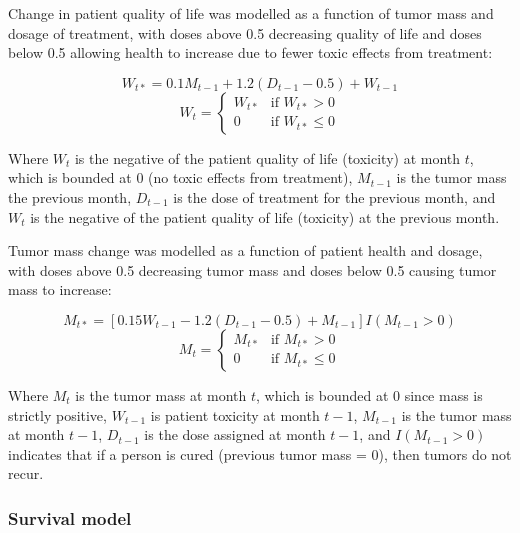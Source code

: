 \documentclass[12pt]{article}
\begin{document}
Change in patient quality of life was modelled as a function of tumor mass and dosage of treatment, with doses above 0.5 decreasing quality of life and doses below 0.5 allowing health to increase due to fewer toxic effects from treatment:

\begin{equation}
W_{t*} = 0.1 M_{t-1} + 1.2 (D_{t-1} - 0.5) + W_{t - 1}
\end{equation}
\begin{equation}
W_{t} = \begin{cases}
  W_{t*} &\text{if } W_{t*} > 0 \\
  0 &\text{if } W_{t*} \leq 0
\end{cases}
\end{equation}

Where $W_{t}$ is the negative of the patient quality of life (toxicity) at month $t$, which is bounded at 0 (no toxic effects from treatment),
$M_{t-1}$ is the tumor mass the previous month,
$D_{t-1}$ is the dose of treatment for the previous month, and
$W_{t}$ is the negative of the patient quality of life (toxicity) at the previous month.

Tumor mass change was modelled as a function of patient health and dosage, with doses above 0.5 decreasing tumor mass and doses below 0.5 causing tumor mass to increase:

\begin{equation}
M_{t*} = [0.15 W_{t-1} - 1.2 (D_{t-1} - 0.5) + M_{t - 1}] I(M_{t-1} > 0)
\end{equation}
\begin{equation}
M_{t} = \begin{cases}
  M_{t*} &\text{if } M_{t*} > 0 \\
  0 &\text{if } M_{t*} \leq 0
\end{cases}
\end{equation}

Where $M_{t}$ is the tumor mass at month $t$, which is bounded at 0 since mass is strictly positive,
$W_{t-1}$ is patient toxicity at month $t - 1$,
$M_{t-1}$ is the tumor mass at month $t - 1$,
$D_{t-1}$ is the dose assigned at month $t - 1$, and
$I(M_{t-1} > 0)$ indicates that if a person is cured (previous tumor mass = 0), then tumors do not recur.


\subsubsection{Survival model} %
\label{ssub:survival_model}
\end{document}
